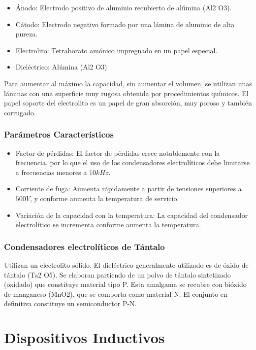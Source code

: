 \begin{itemize}
    \item Ánodo: Electrodo positivo de aluminio recubierto de alúmina (Al2 O3).
    \item Cátodo: Electrodo negativo formado por una lámina de aluminio de alta pureza.
    \item Electrolito: Tetraborato amónico impregnado en un papel especial.
    \item Dieléctrico: Alúmina (Al2 O3)
\end{itemize}

Para aumentar al máximo la capacidad, sin aumentar el volumen, se utilizan unas láminas con una superficie muy rugosa obtenida por procedimientos químicos. El papel soporte del electrolito es un papel de gran absorción, muy poroso y también corrugado.

\subsubsection{Parámetros Característicos}
\begin{itemize}
    \item Factor de pérdidas: El factor de pérdidas crece notablemente con la frecuencia, por lo que el uso de los condensadores electrolíticos debe limitarse a frecuencias menores a $10 kHz$.
    \item Corriente de fuga: Aumenta rápidamente a partir de tensiones superiores a $500 V$, y conforme aumenta la temperatura de servicio.
    \item Variación de la capacidad con la temperatura: La capacidad del condensador electrolítico se incrementa conforme aumenta la temperatura.
\end{itemize}

\subsubsection{Condensadores electrolíticos de Tántalo}

Utilizan un electrolito sólido. El dieléctrico generalmente utilizado es de óxido de tántalo (Ta2 O5). Se elaboran partiendo de un polvo de tántalo sintetizado (oxidado) que constituye material tipo P. Esta amalgama se recubre con bióxido de manganeso (MnO2), que se comporta como material N. El conjunto en definitiva constituye un semiconductor P-N.

\section{Dispositivos Inductivos}

